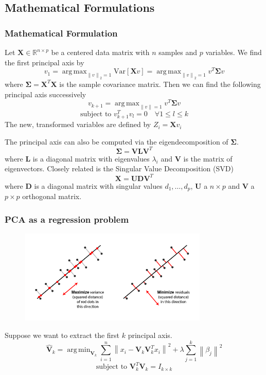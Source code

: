 \documentclass{beamer}
\theoremstyle{plain}
\theoremstyle{definition}
\newcommand{\mat}[1]{\mathbf{#1}}
\DeclareMathOperator*{\argmax}{arg\,max}
\DeclareMathOperator*{\argmin}{arg\,min}
\newcommand{\norm}[1]{\left\lVert #1 \right\rVert}
\begin{document}
\subsection{Mathematical Formulations}
\begin{frame}
\frametitle{Mathematical Formulation}
Let $\mat X \in \mathbb{R}^{n \times p}$ be a centered data matrix with $n$ samples and $p$ variables. We find the first principal axis by 
$$v_1 = \argmax_{\norm{v}_2 = 1} \text{Var}[\mat{X}v] = \argmax_{\norm{v}_2 = 1} v^T \mat{\Sigma} v$$
where $\mat{\Sigma} = \mat X^T \mat X$ is the sample covariance matrix.
Then we can find the following principal axis successively
$$v_{k+1} = \argmax_{\norm{v} = 1} v^T \mat{\Sigma} v$$ 
$$\text{subject to }v_{k+1}^Tv_l = 0 \quad \forall 1 \leq l \leq k$$
The new, transformed variables are defined by $Z_i = \mat{X}v_i$

\end{frame}

\begin{frame}
The principal axis can also be computed via the eigendecomposition of $\mat{\Sigma}$.
$$\mat{\Sigma} = \mat V \mat L \mat{V}^T$$
where $\mat{L}$ is a diagonal matrix with eigenvalues $\lambda_i$ and $\mat V$ is the matrix of eigenvectors.
Closely related is the Singular Value Decomposition (SVD) 
$$ \mat{X} = \mat{U}\mat{D}\mat{V}^T $$
where $\mat{D}$ is a diagonal matrix with singular values $d_1,\ldots,d_p$, $\mat{U}$ a $n \times p$ and $\mat{V}$ a $p \times p$ orthogonal matrix.
\end{frame}

\begin{frame}
\frametitle{PCA as a regression problem}
\begin{figure}
\centering
\includegraphics[width = 0.8\textwidth]{figures/pca_projection_explanation.png}
\label{pca_projection_explanation}
\end{figure}
Suppose we want to extract the first $k$ principal axis.
$$\mat{\hat{V}}_k = \argmin_{\mat{V}_k} \sum_{i=1}^{n} \norm{x_i - \mat{V}_k \mat{V}_k^Tx_i}^2 + \lambda \sum_{j=1}^{k}\norm{\beta_j}^2$$
$$\text{subject to }\mat{V}_k^T\mat{V}_k = I_{k \times k}$$
\end{frame}
\end{document}
